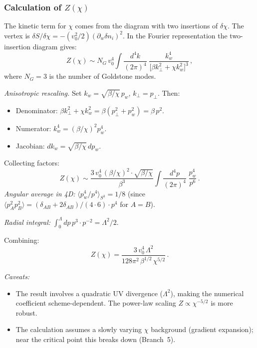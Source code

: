 \documentclass[11pt,a4paper]{article}
\numberwithin{equation}{section}
\begin{document}
\subsubsection{Calculation of $Z(\chi)$}

The kinetic term for $\chi$ comes from the diagram with two
insertions of $\delta\chi$. The vertex is
$\delta S/\delta\chi = -(v_0^2/2)(\partial_w\delta n_i)^2$.
In the Fourier representation the two-insertion diagram gives:
\begin{equation}
Z(\chi) \sim N_G\,v_0^4
\int\frac{d^4k}{(2\pi)^4}\;\frac{k_w^4}
{\bigl[\beta k_\perp^2 + \chi k_w^2\bigr]^3}\,,
\end{equation}
where $N_G = 3$ is the number of Goldstone modes.

\emph{Anisotropic rescaling.}
Set $k_w = \sqrt{\beta/\chi}\,p_w$, $k_\perp = p_\perp$.
Then:
\begin{itemize}
\item Denominator:
  $\beta k_\perp^2 + \chi k_w^2
  = \beta(p_\perp^2 + p_w^2) = \beta\,p^2$.
\item Numerator:
  $k_w^4 = (\beta/\chi)^2 p_w^4$.
\item Jacobian: $dk_w = \sqrt{\beta/\chi}\,dp_w$.
\end{itemize}
Collecting factors:
\begin{equation}
Z(\chi) \sim \frac{3\,v_0^4\,(\beta/\chi)^2
\cdot\sqrt{\beta/\chi}}{\beta^3}
\int\frac{d^4p}{(2\pi)^4}\;\frac{p_w^4}{p^6}\,.
\end{equation}
\emph{Angular average in 4D:}
$\langle p_w^4/p^4\rangle_{S^3} = 1/8$
(since $\langle p_A^2 p_B^2\rangle
= (\delta_{AB}+2\delta_{AB})/(4\cdot6) \cdot p^4$
for $A = B$).

\emph{Radial integral:}
$\int_0^\Lambda dp\,p^3\cdot p^{-2} = \Lambda^2/2$.

Combining:
\begin{equation}
\boxed{
Z(\chi) = \frac{3\,v_0^4\,\Lambda^2}
{128\pi^2\,\beta^{1/2}\,\chi^{5/2}}\,.
}
\label{eq:app_Z_chi}
\end{equation}

\emph{Caveats:}
\begin{itemize}
\item The result involves a quadratic UV divergence ($\Lambda^2$),
  making the numerical coefficient scheme-dependent. The
  power-law scaling $Z \propto \chi^{-5/2}$ is more robust.
\item The calculation assumes a slowly varying $\chi$ background
  (gradient expansion); near the critical point this breaks down
  (Branch~5).
\end{itemize}
\end{document}
